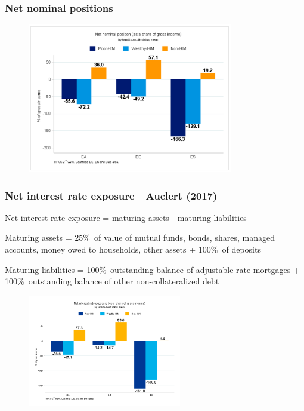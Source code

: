 \documentclass[pdflatex,aspectratio=169]{beamer}
\begin{document}
\begin{frame}\frametitle{\bf Net nominal positions}

\begin{figure}
\begin{center}
\includegraphics[width=0.8\textwidth]{./figures/NNP.pdf}
\end{center}
\end{figure}

\end{frame}



\begin{frame}\frametitle{\bf Net interest rate exposure---Auclert (2017)}

\footnotesize
\bi
\item Net interest rate exposure = maturing assets - maturing liabilities
\item Maturing assets = 25\%\ of value of mutual funds, bonds, shares, managed accounts, money owed to households, other assets + 100\%\ of deposits
\item Maturing liabilities = 100\%\ outstanding balance of adjustable-rate mortgages + 100\%\ outstanding balance of other non-collateralized debt
\ei
\begin{figure}
\begin{center}
\includegraphics[width=0.6\textwidth]{./figures/netIRexposure.png}
\end{center}
\end{figure}
\end{frame}
\end{document}
